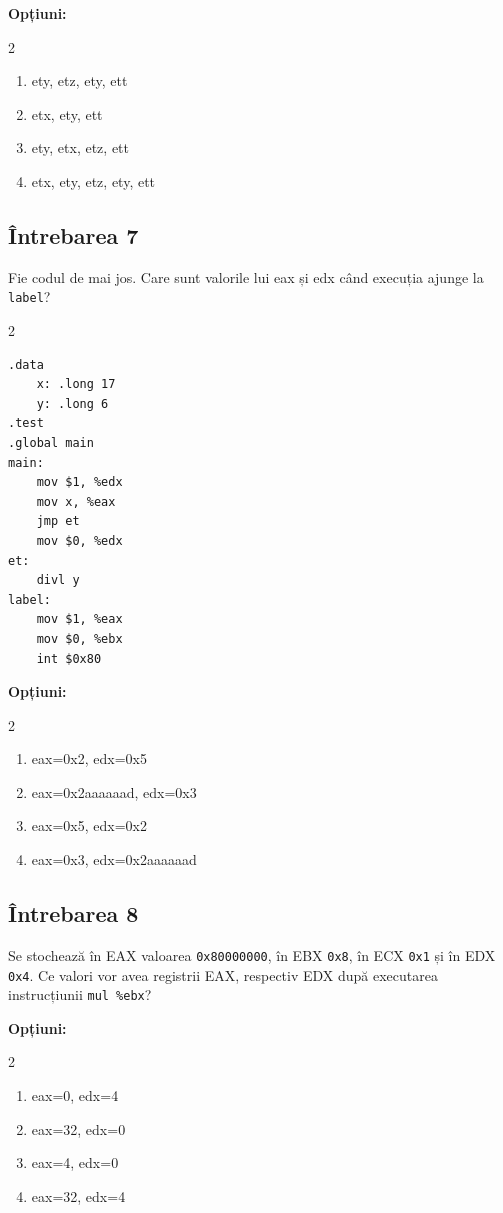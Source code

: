\documentclass[12pt,a4paper]{article}
\begin{document}
\textbf{Opțiuni:}
\begin{multicols}{2}
\begin{enumerate}[label=\alph*)]
    \item ety, etz, ety, ett
    \item etx, ety, ett
    \item ety, etx, etz, ett
    \item etx, ety, etz, ety, ett
\end{enumerate}
\end{multicols}

\subsection*{Întrebarea 7}
Fie codul de mai jos. Care sunt valorile lui eax și edx când execuția ajunge la \texttt{label}?
\begin{multicols}{2}
\begin{lstlisting}[language=x86asm]
.data
    x: .long 17
    y: .long 6
.test
.global main
main:
    mov $1, %edx
    mov x, %eax
    jmp et
    mov $0, %edx
et:
    divl y
label:
    mov $1, %eax
    mov $0, %ebx
    int $0x80
\end{lstlisting}     
\end{multicols}

\textbf{Opțiuni:}
\begin{multicols}{2}
\begin{enumerate}[label=\alph*)]
    \item eax=0x2, edx=0x5
    \item eax=0x2aaaaaad, edx=0x3
    \item eax=0x5, edx=0x2
    \item eax=0x3, edx=0x2aaaaaad
\end{enumerate}
\end{multicols}
\newpage

\subsection*{Întrebarea 8}
Se stochează în EAX valoarea \texttt{0x80000000}, în EBX \texttt{0x8}, în ECX \texttt{0x1} și în EDX \texttt{0x4}. Ce valori vor avea registrii EAX, respectiv EDX după executarea instrucțiunii \texttt{mul \%ebx}?

\textbf{Opțiuni:}
\begin{multicols}{2}
\begin{enumerate}[label=\alph*)]
    \item eax=0, edx=4
    \item eax=32, edx=0
    \item eax=4, edx=0
    \item eax=32, edx=4
\end{enumerate}
\end{multicols}
\end{document}

